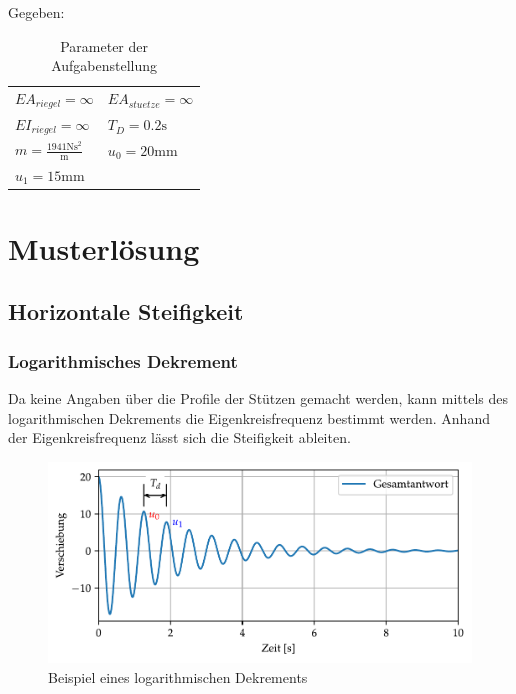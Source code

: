 \documentclass[
  letterpaper,
  DIV=11]{scrreprt}
\begin{document}
Gegeben:

\hypertarget{tbl-parameter_log_dekrement}{}
\begin{longtable}[]{@{}
  >{\raggedright\arraybackslash}p{}
  >{\raggedright\arraybackslash}p{}@{}}
\caption{\label{tbl-parameter_log_dekrement}Parameter der
Aufgabenstellung}\tabularnewline
\toprule\noalign{}
\endfirsthead
\endhead
\bottomrule\noalign{}
\endlastfoot
\(EA_{riegel} = \infty\) & \(EA_{stuetze} = \infty\) \\
\(EI_{riegel} = \infty\) & \(T_{D} = 0.2 \text{s}\) \\
\(m = \frac{1941 \text{N} \text{s}^{2}}{\text{m}}\) &
\(u_{0} = 20 \text{mm}\) \\
\(u_{1} = 15 \text{mm}\) & \\
\end{longtable}

\newpage{}

\hypertarget{sec-ml_log_dek}{%
\section{Musterlösung}\label{sec-ml_log_dek}}

\hypertarget{horizontale-steifigkeit}{%
\subsection{Horizontale Steifigkeit}\label{horizontale-steifigkeit}}

\hypertarget{logarithmisches-dekrement}{%
\subsubsection{Logarithmisches
Dekrement}\label{logarithmisches-dekrement}}

Da keine Angaben über die Profile der Stützen gemacht werden, kann
mittels des logarithmischen Dekrements die Eigenkreisfrequenz bestimmt
werden. Anhand der Eigenkreisfrequenz lässt sich die Steifigkeit
ableiten.

\begin{figure}[H]

{\centering \includegraphics{index_files/mediabag/ems_01_files/figure-pdf/fig-ems_log_dek_zerfall-output-1.pdf}

}

\caption{\label{fig-ems_log_dek_zerfall}Beispiel eines logarithmischen
Dekrements}

\end{figure}
\end{document}
